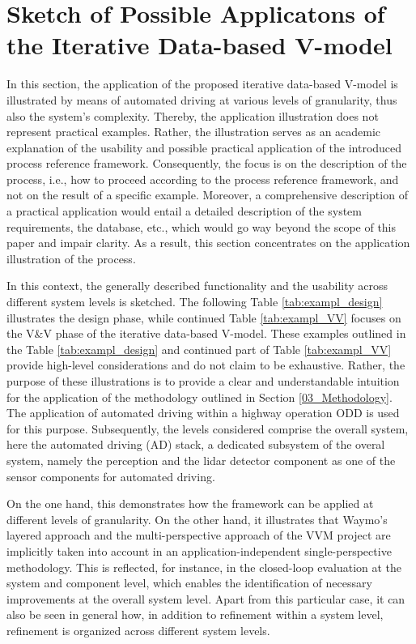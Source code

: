 \section{Sketch of Possible Applicatons of the Iterative Data-based V-model}\label{04_Examples}

In this section, the application of the proposed iterative data-based V-model is illustrated by means of automated driving at various levels of granularity, thus also the system's complexity. Thereby, the application illustration does not represent practical examples. Rather, the illustration serves as an academic explanation of the usability and possible practical application of the introduced process reference framework. Consequently, the focus is on the description of the process, i.e., how to proceed according to the process reference framework, and not on the result of a specific example. Moreover, a comprehensive description of a practical application would entail a detailed description of the system requirements, the database, etc., which would go way beyond the scope of this paper and impair clarity. As a result, this section concentrates on the application illustration of the process.

In this context, the generally described functionality and the usability across different system levels is sketched. The following Table \ref{tab:exampl_design} illustrates the design phase, while continued Table \ref{tab:exampl_VV} focuses on the V\&V phase of the iterative data-based V-model. These examples outlined in the Table \ref{tab:exampl_design} and continued part of Table \ref{tab:exampl_VV} provide high-level considerations and do not claim to be exhaustive. Rather, the purpose of these illustrations is to provide a clear and understandable intuition for the application of the methodology outlined in Section \ref{03_Methodology}. The application of automated driving within a highway operation ODD is used for this purpose. Subsequently, the levels considered comprise the overall system, here the automated driving (AD) stack, a dedicated subsystem of the overal system, namely the perception and the lidar detector component as one of the sensor components for automated driving.

On the one hand, this demonstrates how the framework can be applied at different levels of granularity. On the other hand, it illustrates that Waymo's layered approach \cite{webb2020waymo} and the multi-perspective approach \cite{VVMAPerspectives} of the VVM project are implicitly taken into account in an application-independent single-perspective methodology. This is reflected, for instance, in the closed-loop evaluation at the system and component level, which enables the identification of necessary improvements at the overall system level. Apart from this particular case, it can also be seen in general how, in addition to refinement within a system level, refinement is organized across different system levels.

